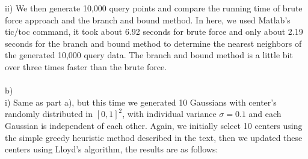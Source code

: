 \documentclass[12pt]{article}
\begin{document}
\indent ii) We then generate 10,000 query points and compare the running time of brute force approach and the branch and bound method. In here, we used Matlab's tic/toc command, it took about 6.92 seconds for brute force and only about 2.19 seconds for the branch and bound method to determine the nearest neighbors of the generated 10,000 query data. The branch and bound method is a little bit over three times faster than the brute force. \\\\
b)\\
\indent i) Same as part a), but this time we generated 10 Gaussians with center's randomly distributed in $\left[ 0, 1\right]^2$, with individual variance $\sigma = 0.1$ and each Gaussian is independent of each other. Again, we initially select 10 centers using the simple greedy heuristic method described in the text, then we updated these centers using Lloyd's algorithm, the results are as follows:
\end{document}
